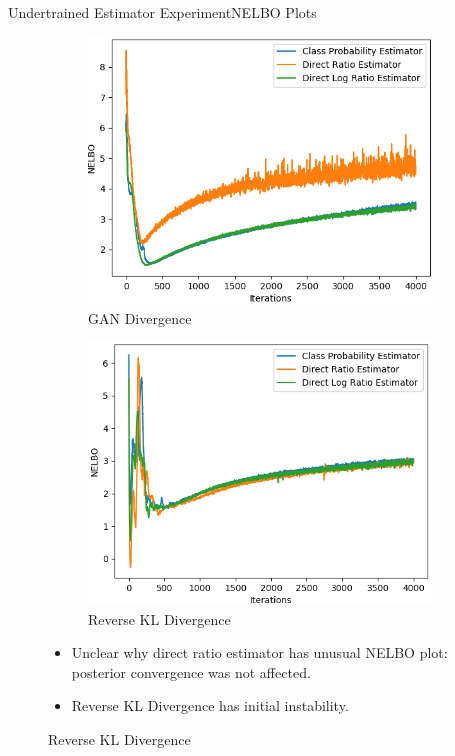 \documentclass[handout]{beamer}
\begin{document}
\begin{frame}{Undertrained Estimator Experiment}{NELBO Plots}
\begin{figure}
\begin{subfigure}{0.49\textwidth}
\includegraphics[width=\linewidth]{part2nelbos/JCADVvsJCADVexpvsJCADVgudlog.png}
\caption{GAN Divergence}
\end{subfigure}
\begin{subfigure}{0.49\textwidth}
\includegraphics[width=\linewidth]{part2nelbos/JCKLDvsJCKLexpvsJCKLgudlog.png}
\caption{Reverse KL Divergence}
\end{subfigure}
\begin{itemize}
\item Unclear why direct ratio estimator has unusual NELBO plot: posterior convergence was not affected.
\item Reverse KL Divergence has initial instability.
\end{itemize}
\end{figure}
\end{frame}
\end{document}
